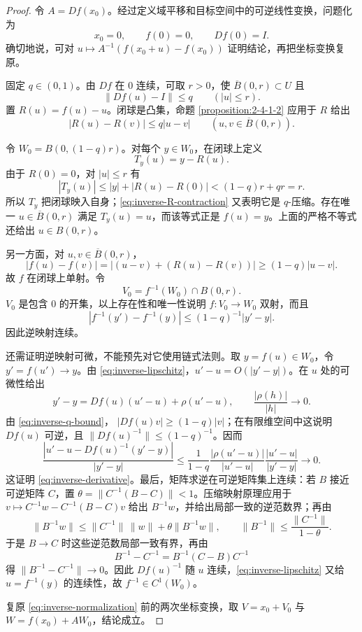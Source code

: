 \begin{proof}
令 $A=Df(x_0)$。经过定义域平移和目标空间中的可逆线性变换，问题化为
\[
 x_0=0,\qquad f(0)=0,\qquad Df(0)=I.
 \tag{2.4.4}\label{eq:inverse-normalization}
\]
确切地说，可对 $u\mapsto A^{-1}(f(x_0+u)-f(x_0))$ 证明结论，再把坐标变换复原。

固定 $q\in(0,1)$。由 $Df$ 在 $0$ 连续，可取 $r>0$，使
$\overline B(0,r)\subset U$ 且
\[
 \|Df(u)-I\|\le q\qquad(|u|\le r).
 \tag{2.4.5}\label{eq:inverse-q-bound}
\]
置 $R(u)=f(u)-u$。闭球是凸集，命题 \ref{proposition:2-4-1-2} 应用于 $R$ 给出
\[
 |R(u)-R(v)|\le q|u-v|\qquad(u,v\in\overline B(0,r)).
 \tag{2.4.6}\label{eq:inverse-R-contraction}
\]

令 $W_0=B(0,(1-q)r)$。对每个 $y\in W_0$，在闭球上定义
\[
 T_y(u)=y-R(u).
\]
由于 $R(0)=0$，对 $|u|\le r$ 有
\[
 |T_y(u)|\le |y|+|R(u)-R(0)|<(1-q)r+qr=r.
\]
所以 $T_y$ 把闭球映入自身；\eqref{eq:inverse-R-contraction} 又表明它是 $q$-压缩。存在唯一
$u\in\overline B(0,r)$ 满足 $T_y(u)=u$，而该等式正是 $f(u)=y$。上面的严格不等式还给出
$u\in B(0,r)$。

另一方面，对 $u,v\in\overline B(0,r)$，
\[
 |f(u)-f(v)|
 =|(u-v)+(R(u)-R(v))|
 \ge(1-q)|u-v|.
 \tag{2.4.7}\label{eq:inverse-lower-lipschitz}
\]
故 $f$ 在闭球上单射。令
\[
 V_0=f^{-1}(W_0)\cap B(0,r).
\]
$V_0$ 是包含 $0$ 的开集，以上存在性和唯一性说明 $f:V_0\to W_0$ 双射，而且
\[
 |f^{-1}(y')-f^{-1}(y)|\le(1-q)^{-1}|y'-y|.
 \tag{2.4.8}\label{eq:inverse-lipschitz}
\]
因此逆映射连续。

还需证明逆映射可微，不能预先对它使用链式法则。取 $y=f(u)\in W_0$，令
$y'=f(u')\to y$。由 \eqref{eq:inverse-lipschitz}，$u'-u=O(|y'-y|)$。在 $u$ 处的可微性给出
\[
 y'-y=Df(u)(u'-u)+\rho(u'-u),
 \qquad \frac{|\rho(h)|}{|h|}\to0.
 \tag{2.4.9}\label{eq:inverse-remainder}
\]
由 \eqref{eq:inverse-q-bound}，
$|Df(u)v|\ge(1-q)|v|$；在有限维空间中这说明 $Df(u)$ 可逆，且
$\|Df(u)^{-1}\|\le(1-q)^{-1}$。因而
\[
 \frac{|u'-u-Df(u)^{-1}(y'-y)|}{|y'-y|}
 \le \frac{1}{1-q}\frac{|\rho(u'-u)|}{|u'-u|}
       \frac{|u'-u|}{|y'-y|}\longrightarrow0.
\]
这证明 \eqref{eq:inverse-derivative}。最后，矩阵求逆在可逆矩阵集上连续：若 $B$ 接近可逆矩阵
$C$，置 $\theta=\|C^{-1}(B-C)\|<1$。压缩映射原理应用于
$v\mapsto C^{-1}w-C^{-1}(B-C)v$ 给出 $B^{-1}w$，并给出局部一致的逆范数界；再由
\[
 \|B^{-1}w\|
 \le\|C^{-1}\|\,\|w\|+\theta\|B^{-1}w\|,
 \qquad
 \|B^{-1}\|\le\frac{\|C^{-1}\|}{1-\theta}.
\]
于是 $B\to C$ 时这些逆范数局部一致有界，再由
\[
 B^{-1}-C^{-1}=B^{-1}(C-B)C^{-1}
\]
得 $\|B^{-1}-C^{-1}\|\to0$。因此
$Df(u)^{-1}$ 随 $u$ 连续，\eqref{eq:inverse-lipschitz} 又给 $u=f^{-1}(y)$ 的连续性，故
$f^{-1}\in C^1(W_0)$。

复原 \eqref{eq:inverse-normalization} 前的两次坐标变换，取
$V=x_0+V_0$ 与 $W=f(x_0)+AW_0$，结论成立。
\end{proof}

